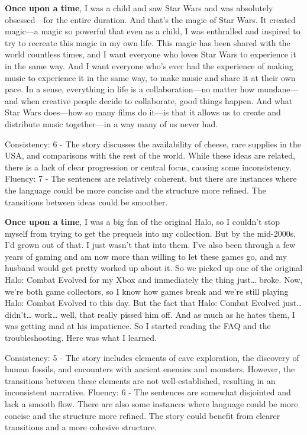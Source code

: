 \documentclass{article}
\begin{document}
\textbf{Once upon a time}, I was a child and saw Star Wars and was absolutely obsessed—for the entire duration. And that's the magic of Star Wars. It created magic—a magic so powerful that even as a child, I was enthralled and inspired to try to recreate this magic in my own life. This magic has been shared with the world countless times, and I want everyone who loves Star Wars to experience it in the same way. And I want everyone who's ever had the experience of making music to experience it in the same way, to make music and share it at their own pace. In a sense, everything in life is a collaboration—no matter how mundane—and when creative people decide to collaborate, good things happen. And what Star Wars does—how so many films do it—is that it allows us to create and distribute music together—in a way many of us never had.

Consistency: 6 - The story discusses the availability of cheese, rare supplies in the USA, and comparisons with the rest of the world. While these ideas are related, there is a lack of clear progression or central focus, causing some inconsistency.
Fluency: 7 - The sentences are relatively coherent, but there are instances where the language could be more concise and the structure more refined. The transitions between ideas could be smoother.

\textbf{Once upon a time}, I was a big fan of the original Halo, so I couldn't stop myself from trying to get the prequels into my collection. But by the mid-2000s, I'd grown out of that. I just wasn't that into them. I've also been through a few years of gaming and am now more than willing to let these games go, and my husband would get pretty worked up about it. So we picked up one of the original Halo: Combat Evolved for my Xbox and immediately the thing just… broke. Now, we're both game collectors, so I know how games break and we're still playing Halo: Combat Evolved to this day. But the fact that Halo: Combat Evolved just… didn't… work… well, that really pissed him off. And as much as he hates them, I was getting mad at his impatience. So I started reading the FAQ and the troubleshooting. Here was what I learned.

Consistency: 5 - The story includes elements of cave exploration, the discovery of human fossils, and encounters with ancient enemies and monsters. However, the transitions between these elements are not well-established, resulting in an inconsistent narrative.
Fluency: 6 - The sentences are somewhat disjointed and lack a smooth flow. There are also some instances where language could be more concise and the structure more refined. The story could benefit from clearer transitions and a more cohesive structure.
\end{document}
